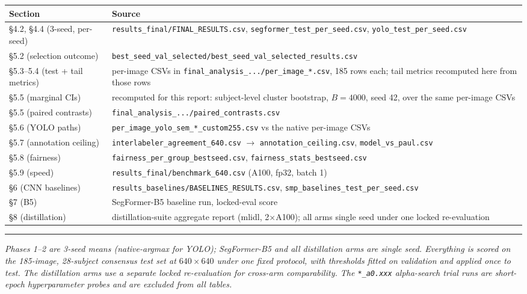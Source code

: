 \documentclass[11pt]{article}
\begin{document}
\begin{center}\footnotesize
\begin{tabular}{>{\raggedright\arraybackslash}p{4.1cm} >{\raggedright\arraybackslash}p{10.3cm}}
\toprule
\textbf{Section} & \textbf{Source} \\
\midrule
\S4.2, \S4.4 (3-seed, per-seed) &
\texttt{results\_final/FINAL\_RESULTS.csv}, \texttt{segformer\_test\_per\_seed.csv},
\texttt{yolo\_test\_per\_seed.csv} \\
\S5.2 (selection outcome) &
\texttt{best\_seed\_val\_selected/best\_seed\_val\_selected\_results.csv} \\
\S5.3--5.4 (test + tail metrics) &
per-image CSVs in \texttt{final\_analysis\_.../per\_image\_*.csv}, 185 rows each; tail metrics
recomputed here from those rows \\
\S5.5 (marginal CIs) &
recomputed for this report: subject-level cluster bootstrap, $B{=}4000$, seed 42, over the same
per-image CSVs \\
\S5.5 (paired contrasts) & \texttt{final\_analysis\_.../paired\_contrasts.csv} \\
\S5.6 (YOLO paths) & \texttt{per\_image\_yolo\_sem\_*\_custom255.csv} vs the native per-image CSVs \\
\S5.7 (annotation ceiling) &
\texttt{interlabeler\_agreement\_640.csv} $\to$ \texttt{annotation\_ceiling.csv},
\texttt{model\_vs\_paul.csv} \\
\S5.8 (fairness) &
\texttt{fairness\_per\_group\_bestseed.csv}, \texttt{fairness\_stats\_bestseed.csv} \\
\S5.9 (speed) & \texttt{results\_final/benchmark\_640.csv} (A100, fp32, batch 1) \\
\S6 (CNN baselines) &
\texttt{results\_baselines/BASELINES\_RESULTS.csv},
\texttt{smp\_baselines\_test\_per\_seed.csv} \\
\S7 (B5) & SegFormer-B5 baseline run, locked-eval score \\
\S8 (distillation) &
distillation-suite aggregate report (mlidl, 2$\times$A100); all arms single seed under one locked
re-evaluation \\
\bottomrule
\end{tabular}
\end{center}

\vspace{6pt}
{\color{rulegray}\hrule height 0.5pt}
\vspace{4pt}

\begin{center}\footnotesize\itshape
Phases 1--2 are 3-seed means (native-argmax for YOLO); SegFormer-B5 and all distillation arms are
single seed. Everything is scored on the 185-image, 28-subject consensus test set at
$640\times640$ under one fixed protocol, with thresholds fitted on validation and applied once to
test. The distillation arms use a separate locked re-evaluation for cross-arm comparability.
The \texttt{*\_a0.xxx} alpha-search trial runs are short-epoch hyperparameter probes and are
excluded from all tables.
\end{center}
\end{document}

